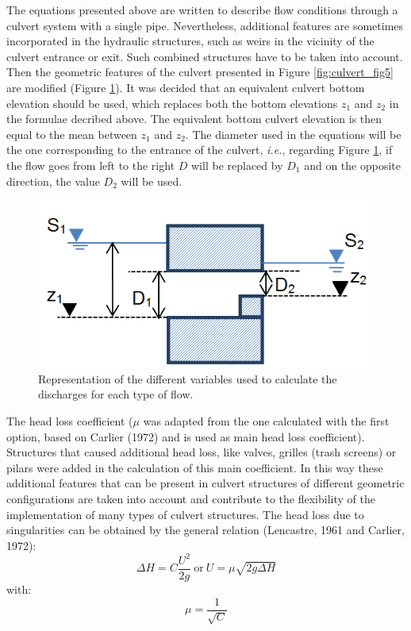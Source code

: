 The equations presented above are written to describe flow conditions through a
culvert system with a single pipe.
Nevertheless, additional features are sometimes incorporated in the hydraulic structures,
such as weirs in the vicinity of the culvert entrance or exit.
Such combined structures have to be taken into account.
Then the geometric features of the culvert presented in Figure \ref{fig:culvert_fig5}
are modified (Figure \ref{fig:culvert_fig6}).
It was decided that an equivalent culvert bottom elevation should be used,
which replaces both the bottom elevations $z_1$ and $z_2$ in the formulae decribed above.
The equivalent bottom culvert elevation is then equal to the mean between $z_1$ and $z_2$.
The diameter used in the equations will be the one corresponding to the entrance of the culvert,
\textit{i.e.}, regarding Figure \ref{fig:culvert_fig6}, if the flow goes from left
to the right $D$ will be replaced by $D_1$ and on the opposite direction,
the value $D_2$ will be used.

\begin{figure}[H]
\begin{center}
  \includegraphics[scale=0.5]{culvert_fig6.png}
\end{center}
\caption{Representation of the different variables used to
calculate the discharges for each type of flow.}
\label{fig:culvert_fig6}
\end{figure}

The head loss coefficient ($\mu$ was adapted from the one calculated with the first option,
based on Carlier (1972) and is used as main head loss coefficient).
Structures that caused additional head loss, like valves, grilles (trash screens) or pilars
were added in the calculation of this main coefficient.
In this way these additional features that can be present in culvert structures of
different geometric configurations are taken into account and contribute to
the flexibility of the implementation of many types of culvert structures.
The head loss due to singularities can be obtained by the general
relation (Lencastre, 1961 and Carlier, 1972):
\begin{equation}
\Delta H = C \dfrac{U^2}{2g} ~\text{or}~  U = \mu \sqrt{2g\Delta H}
\end{equation}
with:
\begin{equation}
\mu =\dfrac{1}{\sqrt{C}}
\end{equation}

